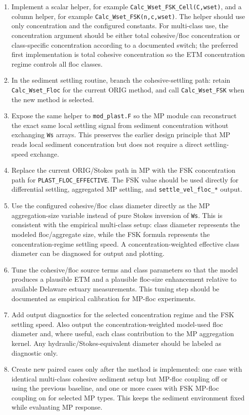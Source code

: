 \documentclass[11pt]{article}
\begin{document}
\begin{enumerate}
  \item Implement a scalar helper, for example
        \texttt{Calc\_Wset\_FSK\_Cell(C,wset)}, and a column helper, for
        example \texttt{Calc\_Wset\_FSK(n,c,wset)}.  The helper should use only
        concentration and the configured constants.  For multi-class use, the
        concentration argument should be either total cohesive/floc
        concentration or class-specific concentration according to a documented
        switch; the preferred first implementation is total cohesive
        concentration so the ETM concentration regime controls all floc classes.
  \item In the sediment settling routine, branch the cohesive-settling path:
        retain \texttt{Calc\_Wset\_Floc} for the current ORIG method, and call
        \texttt{Calc\_Wset\_FSK} when the new method is selected.
  \item Expose the same helper to \texttt{mod\_plast.F} so the MP module can
        reconstruct the exact same local settling signal from sediment
        concentration without exchanging \texttt{Ws} arrays.  This preserves the
        earlier design principle that MP reads local sediment concentration but
        does not require a direct settling-speed exchange.
  \item Replace the current ORIG/Stokes path in MP with the FSK concentration
        path for \texttt{PLAST\_FLOC\_EFFECTIVE}.  The FSK value should be used
        directly for differential settling, aggregated MP settling, and
        \texttt{settle\_vel\_floc\_*} output.
  \item Use the configured cohesive/floc class diameter directly as the MP
        aggregation-size variable instead of pure Stokes inversion of
        \texttt{Ws}.  This is consistent with the empirical multi-class setup:
        class diameter represents the modeled floc/aggregate size, while the
        FSK formula represents the concentration-regime settling speed.
        A concentration-weighted effective class diameter can be diagnosed for
        output and plotting.
  \item Tune the cohesive/floc source terms and class parameters so that the
        model produces a plausible ETM and a plausible floc-size enhancement
        relative to available Delaware estuary measurements.  This tuning step
        should be documented as empirical calibration for MP-floc experiments.
  \item Add output diagnostics for the selected concentration regime and the
        FSK settling speed.  Also output the concentration-weighted model-used
        floc diameter and, where useful, each class contribution to the MP
        aggregation kernel.  Any hydraulic/Stokes-equivalent diameter should be
        labeled as diagnostic only.
  \item Create new paired cases only after the method is implemented: one case
        with identical multi-class cohesive sediment setup but MP-floc coupling
        off or using the previous baseline, and one or more cases with FSK
        MP-floc coupling on for selected MP types.  This keeps the sediment
        environment fixed while evaluating MP response.
\end{enumerate}
\end{document}
